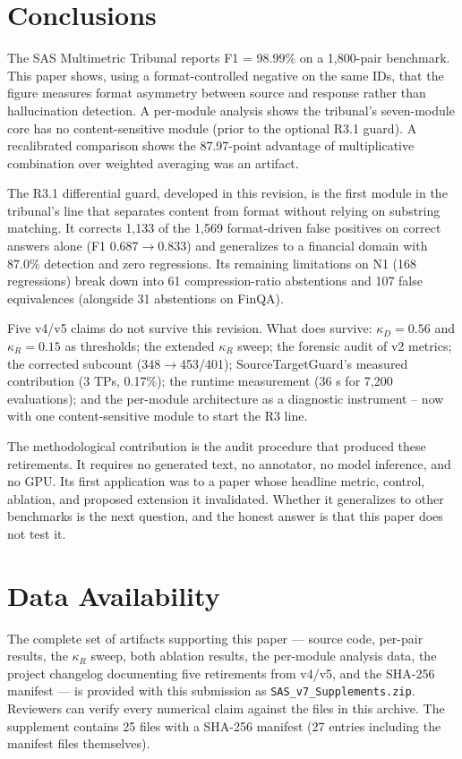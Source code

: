 \documentclass[11pt,a4paper]{article}
\begin{document}
\section{Conclusions}

The SAS Multimetric Tribunal reports F1 = 98.99\% on a 1{,}800-pair benchmark. This paper shows, using a format-controlled negative on the same IDs, that the figure measures format asymmetry between source and response rather than hallucination detection. A per-module analysis shows the tribunal's seven-module core has no content-sensitive module (prior to the optional R3.1 guard). A recalibrated comparison shows the 87.97-point advantage of multiplicative combination over weighted averaging was an artifact.

The R3.1 differential guard, developed in this revision, is the first module in the tribunal's line that separates content from format without relying on substring matching. It corrects 1{,}133 of the 1{,}569 format-driven false positives on correct answers alone (F1 0.687$\to$0.833) and generalizes to a financial domain with 87.0\% detection and zero regressions. Its remaining limitations on N1 (168 regressions) break down into 61 compression-ratio abstentions and 107 false equivalences (alongside 31 abstentions on FinQA).

Five v4/v5 claims do not survive this revision. What does survive: $\kappa_D = 0.56$ and $\kappa_R = 0.15$ as thresholds; the extended $\kappa_R$ sweep; the forensic audit of v2 metrics; the corrected subcount (348$\to$453/401); SourceTargetGuard's measured contribution (3 TPs, 0.17\%); the runtime measurement (36 s for 7{,}200 evaluations); and the per-module architecture as a diagnostic instrument -- now with one content-sensitive module to start the R3 line.

The methodological contribution is the audit procedure that produced these retirements. It requires no generated text, no annotator, no model inference, and no GPU. Its first application was to a paper whose headline metric, control, ablation, and proposed extension it invalidated. Whether it generalizes to other benchmarks is the next question, and the honest answer is that this paper does not test it.

\section*{Data Availability}

The complete set of artifacts supporting this paper --- source code,
per-pair results, the $\kappa_R$ sweep, both ablation results, the
per-module analysis data, the project changelog documenting five
retirements from v4/v5, and the SHA-256 manifest --- is provided with
this submission as \texttt{SAS\_v7\_Supplements.zip}. Reviewers can
verify every numerical claim against the files in this archive. The
supplement contains 25 files with a SHA-256 manifest (27 entries
including the manifest files themselves).
\end{document}
